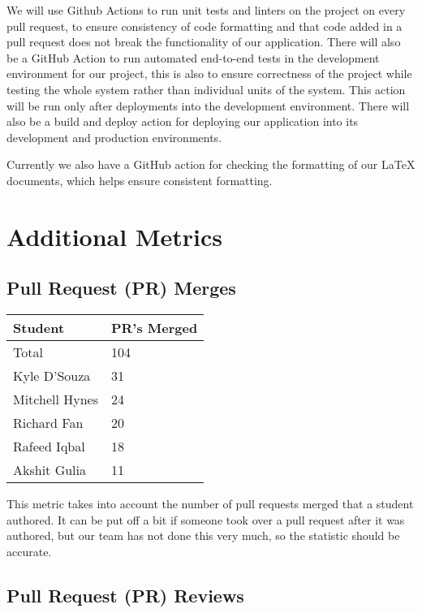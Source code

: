 \documentclass{article}
\begin{document}
We will use Github Actions to run unit tests and linters on the
project on every pull request, to ensure consistency of code
formatting and that code added in a pull request does not break the
functionality of our application. There will also be a GitHub Action
to run automated end-to-end tests in the development environment for
our project, this is also to ensure correctness of the project while
testing the whole system rather than individual units of the system.
This action will be run only after deployments into the development
environment. There will also be a build and deploy action for
deploying our application into its development and production environments.

Currently we also have a GitHub action for checking the formatting of
our LaTeX documents, which helps ensure consistent formatting.

\section{Additional Metrics}

\subsection{Pull Request (PR) Merges}

\begin{table}[H]
  \centering
  \begin{tabular}{ll}
    \toprule
    \textbf{Student} & \textbf{PR's Merged}\\
    \midrule
    Total & 104\\
    Kyle D'Souza & 31\\
    Mitchell Hynes & 24\\
    Richard Fan & 20\\
    Rafeed Iqbal & 18\\
    Akshit Gulia & 11\\
    \bottomrule
  \end{tabular}
\end{table}

This metric takes into account the number of pull requests merged
that a student authored. It can be put off a bit if someone took over
a pull request after it was authored, but our team has not done this
very much, so the statistic should be accurate.

\subsection{Pull Request (PR) Reviews}
\end{document}
